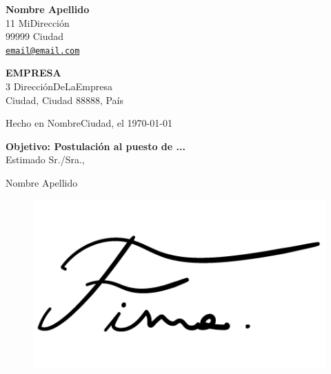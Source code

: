 \documentclass[12pt]{article}
\makeatletter
\newcommand\autor{Nombre Apellido}
\newcommand\datation{Hecho en NombreCiudad, el \today}
\newcommand\objetivo{Postulación al puesto de ...}
\newcommand\midireccion{11 MiDirección}
\newcommand\codigopostalyciudad{99999 Ciudad}
\newcommand\email{\href{mailto:email@email.com}{\texttt{email@email.com}}}
\newcommand\empresadestinataria{\textbf{EMPRESA}}
\newcommand\direccionempresa{3 DirecciónDeLaEmpresa}
\newcommand\ciudadcodigopostalpaysempresa{Ciudad, Ciudad 88888, País}
\makeatother
\begin{document}
\pagestyle{empty}

\textbf{\autor}\\
\midireccion\\
\codigopostalyciudad\\
\email\\

\begin{flushright}
\empresadestinataria\\
\direccionempresa\\
\ciudadcodigopostalpaysempresa\\
\end{flushright}

\datation\\
\par\bigskip\textbf{Objetivo: \objetivo}\\




Estimado Sr./Sra.,


\lipsum[1-2]



\bigskip
\begin{flushright}
	\autor\\
\end{flushright}


\begin{figure}[h]
  \raggedleft
  \includegraphics[scale=0.2]{firma/firma-template.png}
\end{figure}
\end{document}
